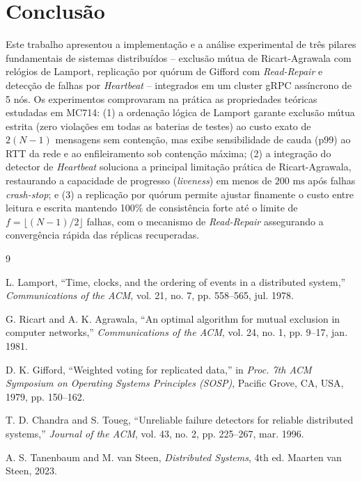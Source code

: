 \documentclass[conference,10pt]{IEEEtran}
\begin{document}
\section{Conclusão}

Este trabalho apresentou a implementação e a análise experimental de três pilares fundamentais de sistemas distribuídos -- exclusão mútua de Ricart-Agrawala com relógios de Lamport, replicação por quórum de Gifford com \textit{Read-Repair} e detecção de falhas por \textit{Heartbeat} -- integrados em um cluster gRPC assíncrono de 5 nós. Os experimentos comprovaram na prática as propriedades teóricas estudadas em MC714: (1) a ordenação lógica de Lamport garante exclusão mútua estrita (zero violações em todas as baterias de testes) ao custo exato de $2(N-1)$ mensagens sem contenção, mas exibe sensibilidade de cauda (p99) ao RTT da rede e ao enfileiramento sob contenção máxima; (2) a integração do detector de \textit{Heartbeat} soluciona a principal limitação prática de Ricart-Agrawala, restaurando a capacidade de progresso (\textit{liveness}) em menos de $200\text{ ms}$ após falhas \textit{crash-stop}; e (3) a replicação por quórum permite ajustar finamente o custo entre leitura e escrita mantendo 100\% de consistência forte até o limite de $f = \lfloor(N-1)/2\rfloor$ falhas, com o mecanismo de \textit{Read-Repair} assegurando a convergência rápida das réplicas recuperadas.

\begin{thebibliography}{9}

L. Lamport, ``Time, clocks, and the ordering of events in a distributed system,'' \textit{Communications of the ACM}, vol. 21, no. 7, pp. 558--565, jul. 1978.

G. Ricart and A. K. Agrawala, ``An optimal algorithm for mutual exclusion in computer networks,'' \textit{Communications of the ACM}, vol. 24, no. 1, pp. 9--17, jan. 1981.

D. K. Gifford, ``Weighted voting for replicated data,'' in \textit{Proc. 7th ACM Symposium on Operating Systems Principles (SOSP)}, Pacific Grove, CA, USA, 1979, pp. 150--162.

T. D. Chandra and S. Toueg, ``Unreliable failure detectors for reliable distributed systems,'' \textit{Journal of the ACM}, vol. 43, no. 2, pp. 225--267, mar. 1996.

A. S. Tanenbaum and M. van Steen, \textit{Distributed Systems}, 4th ed. Maarten van Steen, 2023.

\end{thebibliography}
\end{document}
